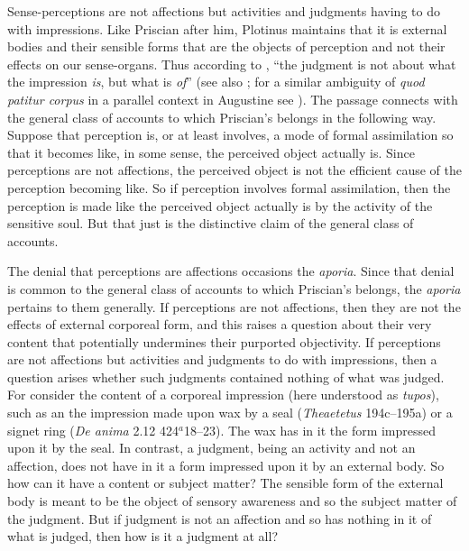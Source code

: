 \documentclass[12pt]{article}
\begin{document}
Sense-perceptions are not affections but activities and judgments having to do with impressions. Like Priscian after him, Plotinus maintains that it is external bodies and their sensible forms that are the objects of perception and not their effects on our sense-organs. Thus according to \citet[73]{Fleet:1995gf}, ``the judgment is not about what the impression \emph{is}, but what is \emph{of}'' (see also \citealt[75 n.28]{Emilsson:1988uq}; for a similar ambiguity of \emph{quod patitur corpus} in a parallel context in Augustine see \citealt{Brittain:2002hl}). The passage connects with the general class of accounts to which Priscian's belongs in the following way. Suppose that perception is, or at least involves, a mode of formal assimilation so that it becomes like, in some sense, the perceived object actually is. Since perceptions are not affections, the perceived object is not the efficient cause of the perception becoming like. So if perception involves formal assimilation, then the perception is made like the perceived object actually is by the activity of the sensitive soul. But that just is the distinctive claim of the general class of accounts.

The denial that perceptions are affections occasions the \emph{aporia}. Since that denial is common to the general class of accounts to which Priscian's belongs, the \emph{aporia} pertains to them generally. If perceptions are not affections, then they are not the effects of external corporeal form, and this raises a question about their very content that potentially undermines their purported objectivity. If perceptions are not affections but activities and judgments to do with impressions, then a question arises whether such judgments contained nothing of what was judged. For consider the content of a corporeal impression (here understood as \emph{tupos}), such as an the impression made upon wax by a seal (\emph{Theaetetus} 194c--195a) or a signet ring (\emph{De anima} 2.12 424\( ^{a} \)18--23). The wax has in it the form impressed upon it by the seal. In contrast, a judgment, being an activity and not an affection, does not have in it a form impressed upon it by an external body. So how can it have a content or subject matter? The sensible form of the external body is meant to be the object of sensory awareness and so the subject matter of the judgment. But if judgment is not an affection and so has nothing in it of what is judged, then how is it a judgment at all?
\end{document}
